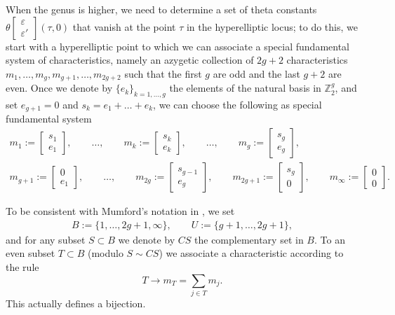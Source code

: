 \documentclass[11pt]{article}
\numberwithin{equation}{section}
\numberwithin{equation}{section}
\newcommand{\ep}{\varepsilon}
\newcommand{\ZZ}{{\mathbb{Z}}}
\def\ZZ{{\mathbb Z}}
\begin{document}
When the genus is higher, we need to determine a set of theta constants $\theta \left[\begin{smallmatrix} \ep \\ \ep ' \end{smallmatrix}\right] (\tau,0)$ that vanish at the point $\tau$ in the hyperelliptic locus; to do this, we start with a hyperelliptic point to which we can associate a special fundamental system of characteristics, namely an azygetic collection of $2g+2$ characteristics $m_1, \dots, m_g, m_{g+1}, \dots, m_{2g+2}$ such that the first $g$ are odd and the last $g+2$ are even. Once we denote by $\{e_k\}_{k=1, \dots, g}$ the elements of the natural basis in ${\ZZ^g_2}$, and set $e_{g+1}= 0$ and $s_k= e_1+\dots+e_k$, we can choose the following as special fundamental system
\begin{gather}
 m_1:=\begin{bmatrix} s_1 \\ e_1\end{bmatrix},\qquad \dots, \qquad m_k:=\begin{bmatrix} s_k \\ e_k\end{bmatrix},\qquad\dots,\qquad m_g:=\begin{bmatrix} s_g \\ e_g\end{bmatrix},
\nonumber\\
m_{g+1}:=\begin{bmatrix} 0 \\ e_{1}\end{bmatrix},\qquad \dots,\qquad m_{2g}:=\begin{bmatrix} s_{g-1} \\ e_{g}\end{bmatrix}, \qquad m_{2g+1}:=\begin{bmatrix} s_g \\ 0
\end{bmatrix},\qquad m_{\infty}:=\begin{bmatrix} 0 \\ 0 \end{bmatrix} .\label{eq:FS}
\end{gather}

To be consistent with Mumford's notation in \cite[p.~106]{mu}, we set
\begin{gather}\label{BU}
B:=\{1, \dots, 2g+ 1, \infty \} ,\qquad U:= \{ g+1, \dots , 2g+1 \},
\end{gather}
and for any subset $S\subset B$ we denote by $ CS$ the complementary set in $B$.
 To an even subset $T\subset B$ (modulo $S \sim CS$) we associate a characteristic according to the rule
 \[
T\to m_T= \sum_{j\in T} m_j .
\]
This actually defines a bijection.
\end{document}
